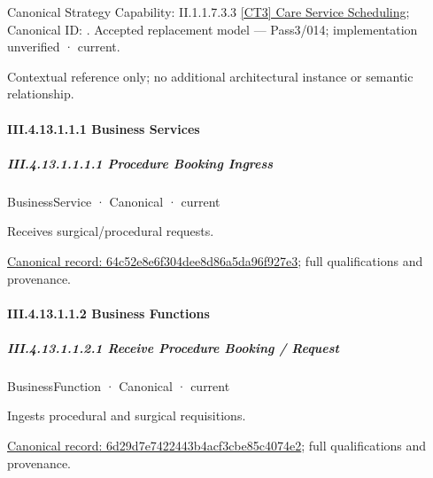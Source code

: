{\small Canonical Strategy Capability: II.1.1.7.3.3 \hyperref[element:e77883e9c25c43fabdfb7dbeb8fbffe3]{[CT3] Care Service Scheduling}; Canonical ID: \texttt{}. Accepted replacement model — Pass3/014; implementation unverified · current.}\par
Contextual reference only; no additional architectural instance or semantic relationship.\par
\paragraph*{III.4.13.1.1.1 Business Services}
\label{navigation:III.4.13.1.1.1}

\subparagraph*{III.4.13.1.1.1.1 Procedure Booking Ingress}
\label{navigation:III.4.13.1.1.1.1}

\label{element:64c52e8e6f304dee8d86a5da96f927e3}
{\small BusinessService · Canonical · current}\par

Receives surgical/procedural requests.


{\footnotesize \href{../../../../../../../../continuum/business/business-service/64c52e8e6f304dee8d86a5da96f927e3.md}{Canonical record: 64c52e8e6f304dee8d86a5da96f927e3}; full qualifications and provenance.}\par
\paragraph*{III.4.13.1.1.2 Business Functions}
\label{navigation:III.4.13.1.1.2}

\subparagraph*{III.4.13.1.1.2.1 Receive Procedure Booking / Request}
\label{navigation:III.4.13.1.1.2.1}

\label{element:6d29d7e7422443b4acf3cbe85c4074e2}
{\small BusinessFunction · Canonical · current}\par

Ingests procedural and surgical requisitions.


{\footnotesize \href{../../../../../../../../continuum/business/business-function/6d29d7e7422443b4acf3cbe85c4074e2.md}{Canonical record: 6d29d7e7422443b4acf3cbe85c4074e2}; full qualifications and provenance.}\par
